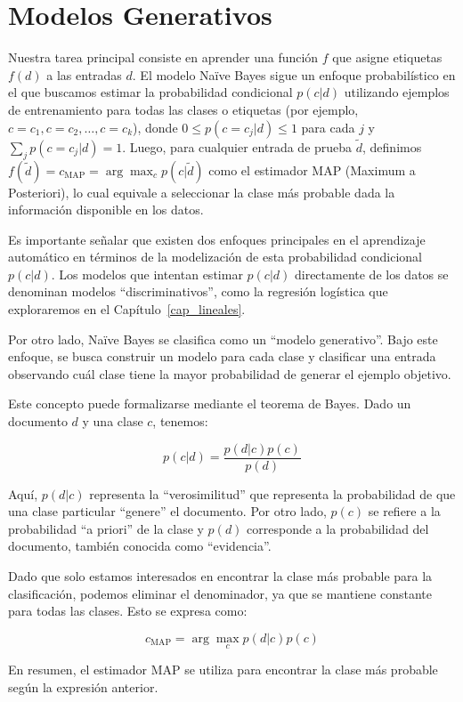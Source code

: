 \documentclass[11pt,fleqn]{book} %
\begin{document}
\section{Modelos Generativos}

Nuestra tarea principal consiste en aprender una función $f$ que asigne etiquetas $f(d)$ a las entradas $d$. El modelo Naïve Bayes sigue un enfoque probabilístico en el que buscamos estimar la probabilidad condicional $p(c|d)$ utilizando ejemplos de entrenamiento para todas las clases o etiquetas (por ejemplo, $c=c_1, c=c_2, \ldots, c=c_k$), donde $0 \leq p(c=c_j|d) \leq 1$ para cada $j$ y $\sum_j p(c=c_j|d)=1$. Luego, para cualquier entrada de prueba $\tilde{d}$, definimos $f(\tilde{d}) = c_{\text{MAP}} = \arg \max_c p(c|\tilde{d})$ como el estimador MAP (Maximum a Posteriori), lo cual equivale a seleccionar la clase más probable dada la información disponible en los datos.

Es importante señalar que existen dos enfoques principales en el aprendizaje automático en términos de la modelización de esta probabilidad condicional $p(c|d)$. Los modelos que intentan estimar $p(c|d)$ directamente de los datos se denominan modelos ``discriminativos'', como la regresión logística que exploraremos en el Capítulo~\ref{cap_lineales}.

Por otro lado, Naïve Bayes se clasifica como un ``modelo generativo''. Bajo este enfoque, se busca construir un modelo para cada clase y clasificar una entrada observando cuál clase tiene la mayor probabilidad de generar el ejemplo objetivo.

Este concepto puede formalizarse mediante el teorema de Bayes. Dado un documento $d$ y una clase $c$, tenemos:

\[
p(c | d) = \frac{p(d | c)p(c)}{p(d)}
\]

Aquí, $p(d | c)$ representa la ``verosimilitud'' que representa la probabilidad de que una clase particular ``genere'' el documento. Por otro lado, $p(c)$ se refiere a la probabilidad ``a priori'' de la clase y $p(d)$ corresponde a la probabilidad del documento, también conocida como ``evidencia''.

Dado que solo estamos interesados en encontrar la clase más probable para la clasificación, podemos eliminar el denominador, ya que se mantiene constante para todas las clases. Esto se expresa como:

\[
c_{\text{MAP}}  = \arg\max_{c} p(d | c)p(c)
\]

En resumen, el estimador MAP se utiliza para encontrar la clase más probable según la expresión anterior.
\end{document}
